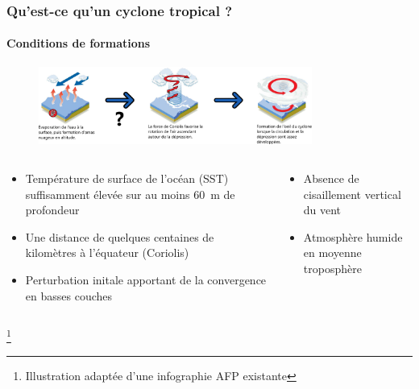 \documentclass[aspectratio=169, usepdftitle=false, xcolor={dvipsnames}, 9pt,table]{beamer}
\newcommand\blfootnote[1]{%
  \begingroup
  \renewcommand\thefootnote{}\footnote{#1}%
  \addtocounter{footnote}{-1}%
  \endgroup
}
\begin{document}
\begin{frame}[c]
    \frametitle{Qu'est-ce qu'un cyclone tropical ?}
    \framesubtitle{Conditions de formations}
    \begin{figure}[h]
        \centering
        \includegraphics[width=0.8\textwidth]{Figures/diagramme_formation.png}
    \end{figure}
    \footnotesize
    \begin{block}
        \begin{columns}[t]
            \scriptsize
            \begin{column}{0.5\textwidth}
                \begin{itemize}
                   \item Température de surface de l'océan (SST) suffisamment élevée \mbox{\parencite{palmen_formation_1948}} sur au moins 60~m de profondeur 
                   \item Une distance de quelques centaines de kilomètres à l'équateur (Coriolis)
                   \item Perturbation initale apportant de la convergence en basses couches
                \end{itemize}
            \end{column}
            \begin{column}{0.5\textwidth}
               \begin{itemize}
                   \item Absence de cisaillement vertical du vent\\\parencite{gray_global_1968}
                   \item Atmosphère humide en moyenne troposphère
               \end{itemize} 
            \end{column}
        \end{columns}
    \end{block}
    \blfootnote{Illustration adaptée d'une infographie AFP existante}
\end{frame}
\end{document}
